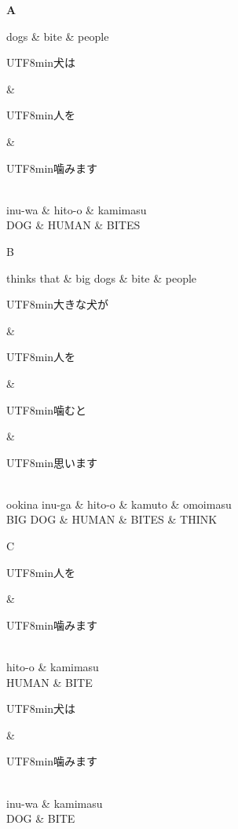 \documentclass[11pt,a4paper]{article}
\newcommand{\japanese}[1]{\begin{CJK}{UTF8}{min}#1\end{CJK}}
\begin{document}
\begin{figure}
\textbf{A}
\begin{dependency}[theme = simple]
   \begin{deptext}[column sep=1em]
          dogs \& bite \& people  \\
   \end{deptext}
\end{dependency}
\begin{dependency}[theme = simple]
   \begin{deptext}[column sep=1em]
   \japanese{犬は} \& \japanese{人を} \& \japanese{噛みます}\\ 
   inu-wa \& hito-o \& kamimasu \\
          DOG \& HUMAN \& BITES  \\
   \end{deptext}
\end{dependency}

B
\begin{dependency}[theme = simple]
   \begin{deptext}[column sep=1em]
       thinks that \& big dogs \& bite \& people  \\
   \end{deptext}
\end{dependency}
\begin{dependency}[theme = simple]
   \begin{deptext}[column sep=1em]
   \japanese{大きな犬が} \& \japanese{人を} \& \japanese{噛むと} \& \japanese{思います}\\ 
   ookina inu-ga \& hito-o \& kamuto \& omoimasu \\
         BIG DOG \& HUMAN \& BITES \& THINK \\
   \end{deptext}
\end{dependency}

C
\begin{dependency}[theme = simple]
   \begin{deptext}[column sep=1em]
   \japanese{人を} \& \japanese{噛みます}\\ 
   hito-o \& kamimasu \\
   HUMAN \& BITE  \\
   \end{deptext}
\end{dependency}
\begin{dependency}[theme = simple]
   \begin{deptext}[column sep=1em]
   \japanese{犬は} \& \japanese{噛みます}\\ 
   inu-wa \& kamimasu \\
          DOG \& BITE  \\
   \end{deptext}
\end{dependency}


\end{figure}
\end{document}

